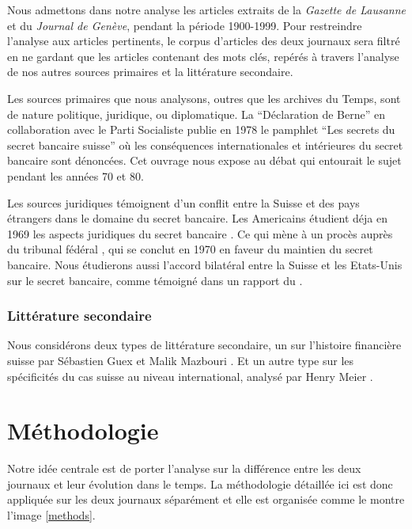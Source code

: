 \documentclass[a4paper, 11pt]{article}
\begin{document}
Nous admettons dans notre analyse les articles extraits de la \textit{Gazette de
Lausanne} et du \textit{Journal de Genève}, pendant la
période 1900-1999. Pour restreindre l’analyse aux articles pertinents, le corpus
d’articles des deux journaux sera filtré en ne gardant que les articles
contenant des mots clés, repérés à travers l’analyse de nos autres sources
primaires et la littérature secondaire.

Les sources primaires que nous analysons, outres que les archives du Temps, sont
de nature politique, juridique, ou diplomatique. La “Déclaration de Berne” en
collaboration avec le Parti Socialiste publie en 1978 le pamphlet “Les secrets
du secret bancaire suisse” \citep{GiovanniniPierLuigi1978Lsds} où les
conséquences internationales et intérieures du secret bancaire sont dénoncées.
Cet ouvrage nous expose au débat qui entourait le sujet pendant les années 70 et
80.

Les sources juridiques témoignent d'un conflit entre la Suisse et des pays
étrangers dans le domaine du secret bancaire. Les Americains étudient déja en
1969 les aspects juridiques du secret bancaire \citep{Mueller69}. Ce qui mène à
un procès auprès du tribunal fédéral \citep{tribunalFederal70}, qui se conclut
en 1970 en faveur du maintien du secret bancaire. Nous étudierons aussi l'accord
bilatéral entre la Suisse et les Etats-Unis sur le secret bancaire, comme
témoigné dans un rapport du \citet{insiderTrading83}.

\subsubsection{Littérature secondaire}

Nous considérons deux types de littérature secondaire, un sur l’histoire financière
suisse par Sébastien Guex et Malik Mazbouri \citep{Guex99, Guex00, Mazbouri12}.
Et un autre type sur les spécificités du cas suisse au niveau international,
analysé par Henry Meier \citep{Meier12}.

\newpage
\hypertarget{muxe9thodologie}{%
\section{Méthodologie}\label{muxe9thodologie}}

Notre idée centrale est de porter l'analyse sur la différence entre les
deux journaux et leur évolution dans le temps. La méthodologie détaillée
ici est donc appliquée sur les deux journaux séparément et elle est
organisée comme le montre l'image \ref{methods}.
\end{document}
